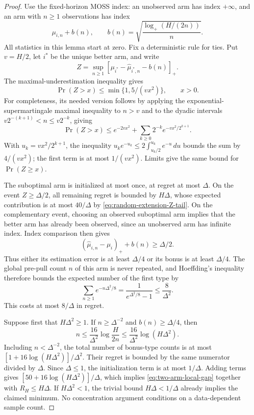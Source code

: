 \begin{proof}
Use the fixed-horizon MOSS index: an unobserved arm has index $+\infty$,
and an arm with $n\ge1$ observations has index
\[
 \widehat\mu_{i,n}+b(n),\qquad
 b(n)=\sqrt{\frac{\log_+(H/(2n))}{n}}.
\]
All statistics in this lemma start at zero. Fix a deterministic rule
for ties. Put $v=H/2$, let $i^*$ be the unique better arm, and write
\[
 Z=\sup_{n\ge1}[\mu_{i^*}-\widehat\mu_{i^*,n}-b(n)]_+.
\]
The maximal-underestimation inequality gives
\begin{equation}
 \Pr(Z>x)\le\min\{1,5/(vx^2)\},\qquad x>0.
 \label{eq:random-extension-Z-tail}
\end{equation}
For completeness, its needed version follows by applying the
exponential-supermartingale maximal inequality to $n>v$ and to the
dyadic intervals $v2^{-(k+1)}<n\le v2^{-k}$, giving
\[
 \Pr(Z>x)\le e^{-2vx^2}
       +\sum_{k\ge0}2^{-k}e^{-vx^2/2^{k+1}}.
\]
With $u_k=vx^2/2^{k+1}$, the inequality
$u_ke^{-u_k}\le2\int_{u_k/2}^{u_k}e^{-u}\,du$ bounds the sum by
$4/(vx^2)$; the first term is at most $1/(vx^2)$.
Limits give the same bound for $\Pr(Z\ge x)$.

The suboptimal arm is initialized at most once, at regret at most
$\Delta$. On the event $Z\ge\Delta/2$, all remaining regret is bounded
by $H\Delta$, whose expected contribution is at most $40/\Delta$ by
\eqref{eq:random-extension-Z-tail}. On the complementary event, choosing
an observed suboptimal arm implies that the better arm has already
been observed, since an unobserved arm has infinite index. Index
comparison then gives
\[
 (\widehat\mu_{i,n}-\mu_i)_++b(n)\ge\Delta/2.
\]
Thus either its estimation error is at least $\Delta/4$ or its bonus
is at least $\Delta/4$. The global pre-pull count $n$ of this arm is
never repeated, and Hoeffding's inequality therefore bounds the
expected number of the first type by
\[
 \sum_{n\ge1}e^{-n\Delta^2/8}
       =\frac1{e^{\Delta^2/8}-1}\le\frac8{\Delta^2}.
\]
This costs at most $8/\Delta$ in regret.

Suppose first that $H\Delta^2\ge1$. If $n\ge\Delta^{-2}$ and
$b(n)\ge\Delta/4$, then
\[
 n\le\frac{16}{\Delta^2}\log\frac{H}{2n}
       \le\frac{16}{\Delta^2}\log(H\Delta^2).
\]
Including $n<\Delta^{-2}$, the total number of bonus-type counts is
at most $[1+16\log(H\Delta^2)]/\Delta^2$. Their regret is bounded by
the same numerator divided by $\Delta$. Since $\Delta\le1$, the
initialization term is at most $1/\Delta$. Adding terms gives
$[50+16\log(H\Delta^2)]/\Delta$, which implies
\eqref{eq:two-arm-local-gap} together with $R_H\le H\Delta$.
If $H\Delta^2<1$, the trivial bound $H\Delta<1/\Delta$ already implies
the claimed minimum. No concentration argument conditions on a
data-dependent sample count.
\end{proof}

